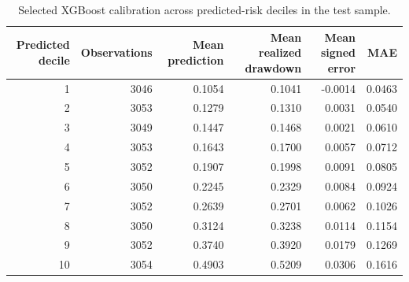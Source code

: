 \begin{table}
\caption{Selected XGBoost calibration across predicted-risk deciles in the test sample.}
\label{tab:xgboost-calibration-by-predicted-decile}
\begin{tabular}{rrrrrr}
\toprule
Predicted decile & Observations & Mean prediction & Mean realized drawdown & Mean signed error & MAE \\
\midrule
1 & 3046 & 0.1054 & 0.1041 & -0.0014 & 0.0463 \\
2 & 3053 & 0.1279 & 0.1310 & 0.0031 & 0.0540 \\
3 & 3049 & 0.1447 & 0.1468 & 0.0021 & 0.0610 \\
4 & 3053 & 0.1643 & 0.1700 & 0.0057 & 0.0712 \\
5 & 3052 & 0.1907 & 0.1998 & 0.0091 & 0.0805 \\
6 & 3050 & 0.2245 & 0.2329 & 0.0084 & 0.0924 \\
7 & 3052 & 0.2639 & 0.2701 & 0.0062 & 0.1026 \\
8 & 3050 & 0.3124 & 0.3238 & 0.0114 & 0.1154 \\
9 & 3052 & 0.3740 & 0.3920 & 0.0179 & 0.1269 \\
10 & 3054 & 0.4903 & 0.5209 & 0.0306 & 0.1616 \\
\bottomrule
\end{tabular}
\end{table}
